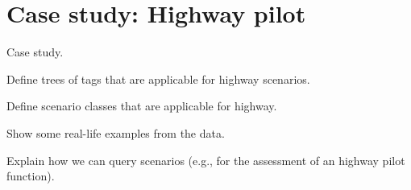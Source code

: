 \section{Case study: Highway pilot}
\label{sec:example}

\color{red}

Case study.

Define trees of tags that are applicable for highway scenarios.

Define scenario classes that are applicable for highway.

Show some real-life examples from the data.

Explain how we can query scenarios (e.g., for the assessment of an highway pilot function).


\color{black}